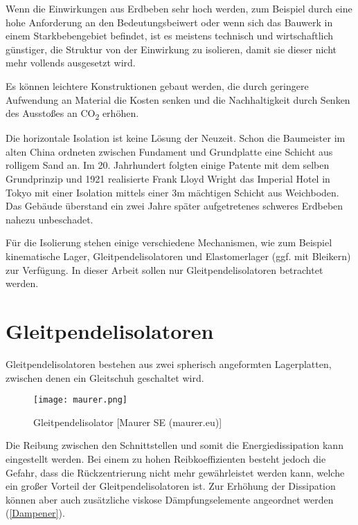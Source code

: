 Wenn die Einwirkungen aus Erdbeben sehr hoch werden, zum Beispiel durch eine hohe Anforderung an den Bedeutungsbeiwert oder wenn sich das Bauwerk in einem Starkbebengebiet befindet, ist es meistens technisch und wirtschaftlich günstiger, die Struktur von der Einwirkung zu isolieren, damit sie dieser nicht mehr vollends ausgesetzt wird.

Es können leichtere Konstruktionen gebaut werden, die durch geringere Aufwendung an Material die Kosten senken und die Nachhaltigkeit durch Senken des Ausstoßes an CO\textsubscript{2} erhöhen.

Die horizontale Isolation ist keine Lösung der Neuzeit. Schon die Baumeister im alten China ordneten zwischen Fundament und Grundplatte eine Schicht aus rolligem Sand an. \cite{Taylor}
Im 20. Jahrhundert folgten einige Patente mit dem selben Grundprinzip und 1921 realisierte Frank Lloyd Wright das Imperial Hotel in Tokyo mit einer Isolation mittels einer 3m mächtigen Schicht aus Weichboden. Das Gebäude überstand ein zwei Jahre später aufgetretenes schweres Erdbeben nahezu unbeschadet. \cite{Reitherman}

Für die Isolierung stehen einige verschiedene Mechanismen, wie zum Beispiel kinematische Lager, Gleitpendelisolatoren und Elastomerlager (ggf. mit Bleikern) zur Verfügung.
In dieser Arbeit sollen nur Gleitpendelisolatoren betrachtet werden.

\pagebreak

\section{Gleitpendelisolatoren}
\label{sec:gleitisolatoren}

 Gleitpendelisolatoren bestehen aus zwei spherisch angeformten Lagerplatten, zwischen denen ein Gleitschuh geschaltet wird.

\begin{figure}[H]
    \centering
    \texttt{[image: maurer.png]}
    \caption{Gleitpendelisolator [Maurer SE (maurer.eu)]}
\end{figure}

Die Reibung zwischen den Schnittstellen und somit die Energiedissipation kann eingestellt werden.
Bei einem zu hohen Reibkoeffizienten besteht jedoch die Gefahr, dass die Rückzentrierung nicht mehr gewährleistet werden kann, welche ein großer Vorteil der Gleitpendelisolatoren ist.
Zur Erhöhung der Dissipation können aber auch zusätzliche viskose Dämpfungselemente angeordnet werden (\cref{Dampener}).

